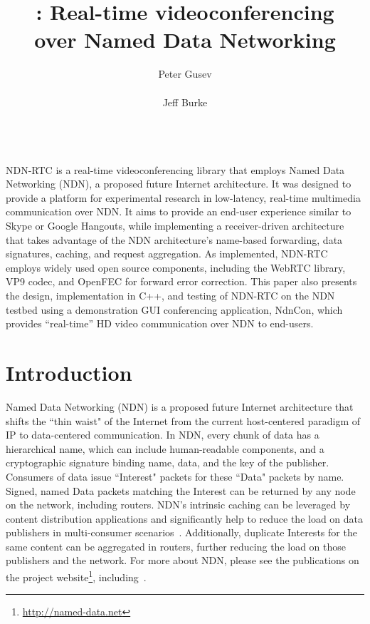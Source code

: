 \documentclass{icn/sig-alternate-2013} %
\title{\ndnrtcName{}: Real-time videoconferencing\\ over Named Data Networking}
\author{
\alignauthor Peter Gusev\\
       \affaddr{UCLA REMAP}\\
       \email{peter@remap.ucla.edu}
\alignauthor Jeff Burke\\
       \affaddr{UCLA REMAP}\\
       \email{jburke@remap.ucla.edu}
}
\newcommand{\ndnrtcName}{NDN-RTC} %
\newcommand{\ndnconName}{NdnCon}
\begin{document}
\maketitle

\abstract
\ndnrtcName{} is a real-time videoconferencing library that employs Named Data Networking (NDN), a proposed future Internet architecture. It was designed to 
provide a platform for experimental research in low-latency, real-time multimedia communication over NDN. It aims to provide an end-user experience similar to Skype or Google Hangouts, while implementing a receiver-driven architecture that takes advantage of the NDN architecture's name-based forwarding, data signatures, caching, and request aggregation.  As implemented, \ndnrtcName{} employs widely used open source components, including the WebRTC library, VP9 codec, and OpenFEC for forward error correction. This paper also presents the design, implementation in C++, and testing of \ndnrtcName{} on the NDN testbed using a demonstration GUI conferencing application, \ndnconName{}, which provides ``real-time'' HD video communication over NDN to end-users. 
\section{Introduction}
Named Data Networking (NDN) is a proposed future Internet architecture that shifts the ``thin waist" of the Internet from the current host-centered paradigm of IP to data-centered communication. In NDN, every chunk of data has a hierarchical name, which can include human-readable components, and a cryptographic signature binding name, data, and the key of the publisher.  Consumers of data issue ``Interest" packets for these ``Data" packets by name. Signed, named Data packets matching the Interest can be returned by any node on the network, including routers. NDN's intrinsic caching can be leveraged by content distribution applications and significantly help to reduce the load on data publishers in multi-consumer scenarios~\cite{ndnvideo}. Additionally, duplicate Interests for the same content can be aggregated in routers, further reducing the load on those publishers and the network. For more about NDN, please see the publications on the project website\footnote{\url{http://named-data.net}}, including~\cite{ndntechreport, ndntechreport0, ndn-netw}.
\end{document}
